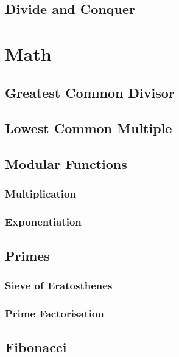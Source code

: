 \documentclass{article}
\begin{document}

\subsection{Divide and Conquer}


\section{Math}
\subsection{Greatest Common Divisor}

\subsection{Lowest Common Multiple}


\subsection{Modular Functions}
\subsubsection{Multiplication}

\subsubsection{Exponentiation}


\subsection{Primes}
\subsubsection{Sieve of Eratosthenes}

\subsubsection{Prime Factorisation}


\subsection{Fibonacci}

\end{document}
